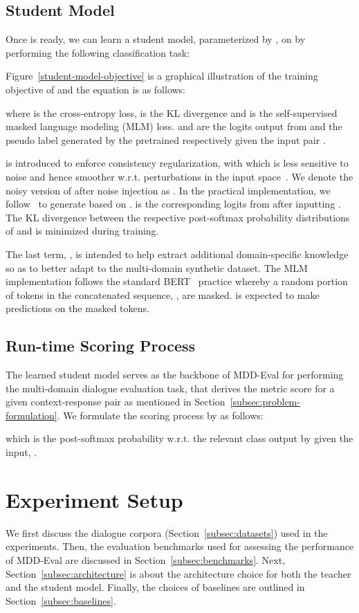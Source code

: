 \documentclass[letterpaper]{article} \usepackage{aaai22}  \usepackage{times}  \usepackage{helvet}  \usepackage{courier}  \usepackage[hyphens]{url}  \usepackage{graphicx} \urlstyle{rm} \def\UrlFont{\rm}  \usepackage{natbib}  \usepackage{caption} \DeclareCaptionStyle{ruled}{labelfont=normalfont,labelsep=colon,strut=off} \frenchspacing  \setlength{\pdfpagewidth}{8.5in}  \setlength{\pdfpageheight}{11in}  \usepackage{algorithm}
\begin{document}
\subsection{Student Model}
\label{subsec:student-model}
Once  is ready, we can learn a student model,  parameterized by , on  by performing the following classification task:

Figure~\ref{student-model-objective} is a graphical illustration of the training objective of  and the equation is as follows: 

where  is the cross-entropy loss,  is the KL divergence and  is the self-supervised masked language modeling (MLM) loss.  and  are the logits output from  and the pseudo label generated by the pretrained  respectively given the input pair . 


 is introduced to enforce consistency regularization, with which  is less sensitive to noise and hence smoother w.r.t. perturbations in the input space~\citep{xie2020unsupervised}. We denote the noisy version of  after noise injection as . In the practical implementation, we follow~\citep{he2019revisiting} to generate  based on .  is the corresponding logits from  after inputting . The KL divergence between the respective post-softmax probability distributions of  and  is minimized during training.

The last term, , is intended to help  extract additional domain-specific knowledge so as to better adapt to the multi-domain synthetic dataset. The MLM implementation follows the standard BERT~\citep{devlin2019bert} practice whereby a random portion of tokens in the concatenated sequence, , are masked.  is expected to make predictions on the masked tokens.



\subsection{Run-time Scoring Process}
\label{subsec:score-process}
The learned student model serves as the backbone of MDD-Eval for performing the multi-domain dialogue evaluation task, that derives the metric score  for a given context-response pair  as mentioned in Section~\ref{subsec:problem-formulation}. We formulate the scoring process by  as follows:

which is the post-softmax probability w.r.t. the relevant class output by  given the input, .  





\section{Experiment Setup}
\label{sec:experiment}
We first discuss the dialogue corpora (Section~\ref{subsec:datasets}) used in the experiments. Then, the evaluation benchmarks used for assessing the performance of MDD-Eval are discussed in Section~\ref{subsec:benchmarks}. Next, Section~\ref{subsec:architecture} is about the architecture choice for both the teacher and the student model. Finally, the choices of baselines are outlined in Section~\ref{subsec:baselines}.    
\end{document}
